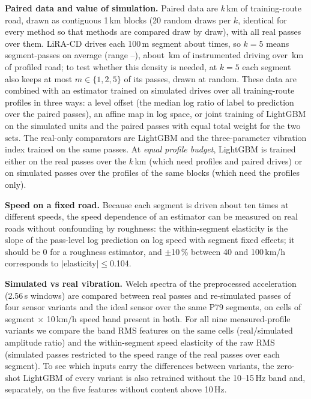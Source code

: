 \textbf{Paired data and value of simulation.}
Paired data are $k$\,km of training-route road, drawn as contiguous 1\,km blocks (20 random draws per $k$, identical for every method so that methods are compared draw by draw), with all real passes over them.
LiRA-CD drives each 100\,m segment about \kdPassesFive{} times, so $k=5$ means \kdUnitsFive{} segment-passes on average (range \kdUnitsFiveMin--\kdUnitsFiveMax), about \kdDriveKmFive\,km of instrumented driving over \kdKmFive\,km of profiled road; to test whether this density is needed, at $k=5$ each segment also keeps at most $m\in\{1,2,5\}$ of its passes, drawn at random.
These data are combined with an estimator trained on simulated drives over all training-route profiles in three ways: a level offset (the median log ratio of label to prediction over the paired passes), an affine map in log space, or joint training of LightGBM on the simulated units and the paired passes with equal total weight for the two sets.
The real-only comparators are LightGBM and the three-parameter vibration index trained on the same passes.
At \emph{equal profile budget}, LightGBM is trained either on the real passes over the $k$\,km (which need profiles and paired drives) or on simulated passes over the profiles of the same blocks (which need the profiles only).

\textbf{Speed on a fixed road.}
Because each segment is driven about ten times at different speeds, the speed dependence of an estimator can be measured on real roads without confounding by roughness: the within-segment elasticity is the slope of the pass-level log prediction on log speed with segment fixed effects; it should be 0 for a roughness estimator, and $\pm$10\,\% between 40 and 100\,km/h corresponds to $|$elasticity$|\le$0.104.

\textbf{Simulated vs real vibration.}
Welch spectra of the preprocessed acceleration (2.56\,s windows) are compared between real passes and re-simulated passes of four sensor variants and the ideal sensor over the same P79 segments, on cells of segment $\times$ 10\,km/h speed band present in both.
For all nine measured-profile variants we compare the band RMS features on the same cells (real/simulated amplitude ratio) and the within-segment speed elasticity of the raw RMS (simulated passes restricted to the speed range of the real passes over each segment).
To see which inputs carry the differences between variants, the zero-shot LightGBM of every variant is also retrained without the 10--15\,Hz band and, separately, on the five features without content above 10\,Hz.

